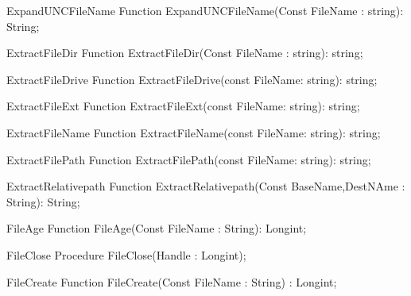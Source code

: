  
\begin{function}{ExpandUNCFileName}
\Declaration
Function ExpandUNCFileName(Const FileName : string): String;
\Description
\Errors
\SeeAlso
\end{function}

 
\begin{function}{ExtractFileDir}
\Declaration
Function ExtractFileDir(Const FileName : string): string;
\Description
\Errors
\SeeAlso
\end{function}

 
\begin{function}{ExtractFileDrive}
\Declaration
Function ExtractFileDrive(const FileName: string): string;
\Description
\Errors
\SeeAlso
\end{function}

 
\begin{function}{ExtractFileExt}
\Declaration
Function ExtractFileExt(const FileName: string): string; 
\Description
\Errors
\SeeAlso
\end{function}

 
\begin{function}{ExtractFileName}
\Declaration
Function ExtractFileName(const FileName: string): string;
\Description
\Errors
\SeeAlso
\end{function}

 
\begin{function}{ExtractFilePath}
\Declaration
Function ExtractFilePath(const FileName: string): string;
\Description
\Errors
\SeeAlso
\end{function}

 
\begin{function}{ExtractRelativepath}
\Declaration
Function ExtractRelativepath(Const BaseName,DestNAme : String): String;
\Description
\Errors
\SeeAlso
\end{function}

 
\begin{function}{FileAge}
\Declaration
Function FileAge(Const FileName : String): Longint;
\Description
\Errors
\SeeAlso
\end{function}

 
\begin{procedure}{FileClose}
\Declaration
Procedure FileClose(Handle : Longint);
\Description
\Errors
\SeeAlso
\end{procedure}

 
\begin{function}{FileCreate}
\Declaration
Function FileCreate(Const FileName : String) : Longint;
\Description
\Errors
\SeeAlso
\end{function}

